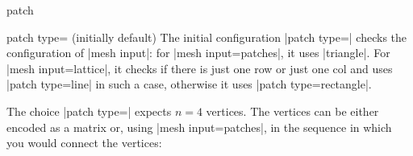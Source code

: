 {\begin{plottype}[/pgfplots]{patch}
\begin{pgfplotskey}{patch type= (initially default)}
        The initial configuration |patch type=| checks the
        configuration of |mesh input|: for |mesh input=patches|, it uses
        |triangle|. For |mesh input=lattice|, it checks if there is just one
        row or just one col and uses |patch type=line| in such a case,
        otherwise it uses |patch type=rectangle|.

        The choice |patch type=| expects $n=4$
        vertices. The vertices can be either encoded as a matrix or, using
        |mesh input=patches|, in the sequence in which you would connect the
        vertices:
\begin{codeexample}[]
\end{codeexample}


\end{pgfplotskey}
\end{plottype}}
